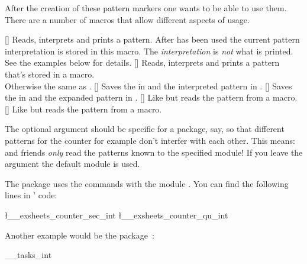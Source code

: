 \documentclass[load-preamble+]{cnltx-doc}
\newcommand*\at{\cnltxat}
\begin{document}
After the creation of these pattern markers one wants to be able to use them.
There are a number of macros that allow different aspects of usage.
\begin{commands}
  []
    Reads, interprets and prints a pattern.
  \expandable\command{\at cntfmts\at parsed\at pattern}
    After  has been used the current pattern
    interpretation is stored in this macro.  The \emph{interpretation} is
    \emph{not} what is printed.  See the examples below for details.
  []
    Reads, interprets and prints a pattern that's stored in a macro.\\
    Otherwise the same as .
  []
    Saves the  in  and the interpreted pattern in
    .
  []
    Saves the  in  and the expanded pattern in
    .
  []
    Like  but reads the pattern from a macro.
  []
    Like  but reads the pattern from a macro.
\end{commands}

The optional argument  should be specific for a package, say, so
that different patterns for the  counter for example don't
interfer with each other.  This means:  and friends
\emph{only} read the patterns known to the specified module!  If you leave the
argument the default module  is used.

The  package uses the commands with the module .
You can find the following lines in ' code:
\begin{sourcecode}
   \l__exsheets_counter_sec_int
   \l__exsheets_counter_qu_int
\end{sourcecode}

Another example would be the  package~\cite{pkg:tasks}:
\begin{sourcecode}
   \g__tasks_int
\end{sourcecode}
\end{document}
